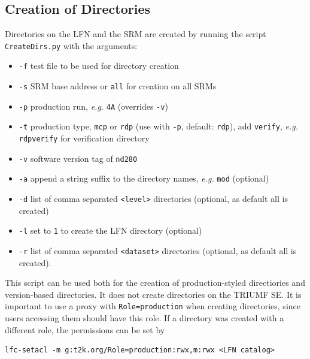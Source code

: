 \documentclass[11pt]{article}
\begin{document}
\subsection{Creation of Directories}
Directories on the LFN and the SRM are created by running the script \verb+CreateDirs.py+ with the arguments:
\begin{itemize}
\item \verb+-f+ test file to be used for directory creation
\item \verb+-s+ SRM base address or \verb+all+ for creation on all SRMs
\item \verb+-p+ production run, \textit{e.g.} \verb+4A+ (overrides \verb+-v+)
\item \verb+-t+ production type, \verb+mcp+ or \verb+rdp+ (use with \verb+-p+, default: 
\verb+rdp+), add \verb+verify+, \textit{e.g.} \verb+rdpverify+ for verification directory
\item \verb+-v+ software version tag of \verb+nd280+
\item \verb+-a+ append a string suffix to the directory names, \textit{e.g.} \verb+mod+ (optional)
\item \verb+-d+ list of comma separated \verb+<level>+ directories (optional, as default all is created)
\item \verb+-l+ set to \verb+1+ to create the LFN directory (optional)
\item \verb+-r+ list of comma separated \verb+<dataset>+ directories (optional, as default all is created).
\end{itemize}

This script can be used both for the creation of production-styled directiories and version-based directories. It does not create directories on the TRIUMF SE.
It is important to use a proxy with \verb+Role=production+ when creating directories, since users accessing them should have this role. If a directory was created with a different role, the permissions can be set by
\begin{verbatim}
lfc-setacl -m g:t2k.org/Role=production:rwx,m:rwx <LFN catalog>
\end{verbatim} 
\end{document}
